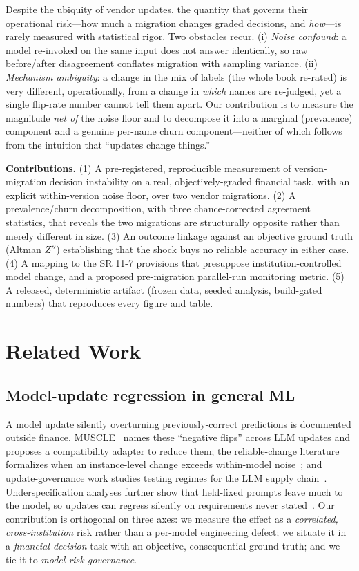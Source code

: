 \documentclass[10pt,twocolumn]{article}
\begin{document}
Despite the ubiquity of vendor updates, the quantity that governs their operational risk---how much a migration changes graded decisions, and \emph{how}---is rarely measured with statistical rigor. Two obstacles recur. (i) \emph{Noise confound}: a model re-invoked on the same input does not answer identically, so raw before/after disagreement conflates migration with sampling variance. (ii) \emph{Mechanism ambiguity}: a change in the mix of labels (the whole book re-rated) is very different, operationally, from a change in \emph{which} names are re-judged, yet a single flip-rate number cannot tell them apart. Our contribution is to measure the magnitude \emph{net of} the noise floor and to decompose it into a marginal (prevalence) component and a genuine per-name churn component---neither of which follows from the intuition that ``updates change things.''

\noindent\textbf{Contributions.} (1) A pre-registered, reproducible measurement of version-migration decision instability on a real, objectively-graded financial task, with an explicit within-version noise floor, over two vendor migrations. (2) A prevalence/churn decomposition, with three chance-corrected agreement statistics, that reveals the two migrations are structurally opposite rather than merely different in size. (3) An outcome linkage against an objective ground truth (Altman $Z''$) establishing that the shock buys no reliable accuracy in either case. (4) A mapping to the SR 11-7 provisions that presuppose institution-controlled model change, and a proposed pre-migration parallel-run monitoring metric. (5) A released, deterministic artifact (frozen data, seeded analysis, build-gated numbers) that reproduces every figure and table.

\section{Related Work}
\subsection{Model-update regression in general ML}
A model update silently overturning previously-correct predictions is documented outside finance. MUSCLE~\cite{muscle} names these ``negative flips'' across LLM updates and proposes a compatibility adapter to reduce them; the reliable-change literature formalizes when an instance-level change exceeds within-model noise~\cite{reliable}; and update-governance work studies testing regimes for the LLM supply chain~\cite{supply}. Underspecification analyses further show that held-fixed prompts leave much to the model, so updates can regress silently on requirements never stated~\cite{underspec}. Our contribution is orthogonal on three axes: we measure the effect as a \emph{correlated, cross-institution} risk rather than a per-model engineering defect; we situate it in a \emph{financial decision} task with an objective, consequential ground truth; and we tie it to \emph{model-risk governance}.
\end{document}
